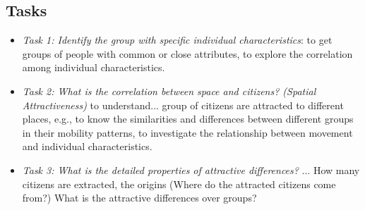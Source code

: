 \subsection{Tasks}


\begin{itemize}
\item \textit{Task 1: Identify the group with specific individual characteristics}: to get groups of people with common or close attributes, to explore the correlation among individual characteristics.
\item \textit{Task 2: What is the correlation between space and citizens? (Spatial Attractiveness)} to understand... group of citizens are attracted to different places, e.g., to know the similarities and differences between different groups in their mobility patterns, to investigate the relationship between movement and individual characteristics.

\item \textit{Task 3: What is the detailed properties of attractive differences?} ... How many citizens are extracted, the origins (Where do the attracted citizens come from?) What is the attractive differences over groups?


\end{itemize}

